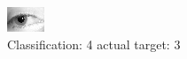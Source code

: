\begin{figure}[h!]
\begin{center}
\includegraphics[width=0.60\columnwidth]{figures/ID1340_class_4_target_3.png}
\end{center}
\caption{ Classification: 4 actual target: 3}
\label{fig:ID1340_class_4_target_3}
\end{figure}
